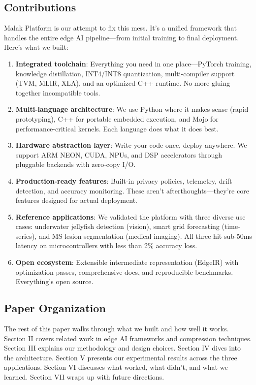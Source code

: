 \subsection{Contributions}

Malak Platform is our attempt to fix this mess. It's a unified framework that handles the entire edge AI pipeline—from initial training to final deployment. Here's what we built:

\begin{enumerate}
\item \textbf{Integrated toolchain}: Everything you need in one place—PyTorch training, knowledge distillation, INT4/INT8 quantization, multi-compiler support (TVM, MLIR, XLA), and an optimized C++ runtime. No more gluing together incompatible tools.

\item \textbf{Multi-language architecture}: We use Python where it makes sense (rapid prototyping), C++ for portable embedded execution, and Mojo for performance-critical kernels. Each language does what it does best.

\item \textbf{Hardware abstraction layer}: Write your code once, deploy anywhere. We support ARM NEON, CUDA, NPUs, and DSP accelerators through pluggable backends with zero-copy I/O.

\item \textbf{Production-ready features}: Built-in privacy policies, telemetry, drift detection, and accuracy monitoring. These aren't afterthoughts—they're core features designed for actual deployment.

\item \textbf{Reference applications}: We validated the platform with three diverse use cases: underwater jellyfish detection (vision), smart grid forecasting (time-series), and MS lesion segmentation (medical imaging). All three hit sub-50ms latency on microcontrollers with less than 2\% accuracy loss.

\item \textbf{Open ecosystem}: Extensible intermediate representation (EdgeIR) with optimization passes, comprehensive docs, and reproducible benchmarks. Everything's open source.
\end{enumerate}

\subsection{Paper Organization}

The rest of this paper walks through what we built and how well it works. Section II covers related work in edge AI frameworks and compression techniques. Section III explains our methodology and design choices. Section IV dives into the architecture. Section V presents our experimental results across the three applications. Section VI discusses what worked, what didn't, and what we learned. Section VII wraps up with future directions.
